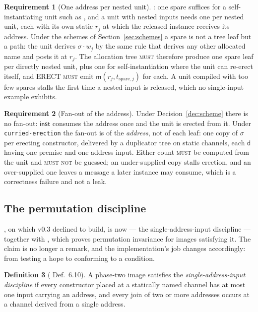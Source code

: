 \documentclass[11pt,a4paper]{article}
\newcommand{\code}[1]{\texttt{#1}}
\newcommand{\MUST}{\textsc{must}}
\newcommand{\MUSTNOT}{\textsc{must not}}
\newcommand{\mm}{\mathsf{m}}
\newcommand{\dd}{\mathsf{d}}
\newcommand{\ERECT}{\mathrm{ERECT}}
\newcommand{\inst}{\mathsf{inst}}
\theoremstyle{definition}
\newtheorem{definition}{Definition}[section]
\newtheorem{requirement}[definition]{Requirement}
\theoremstyle{plain}
\begin{document}
\begin{requirement}[One address per nested unit]\label{req:spares}
\cite[Rem.~6.13]{draft3}: one spare suffices for a self-instantiating unit
such as \cite[Ex.~6.9]{draft3}, and a unit with nested inputs needs one per
nested unit, each with its own static $r_{j}$ at which the released instance
receives its address. Under the schemes of Section~\ref{sec:schemes} a spare
is not a tree leaf but a path: the unit derives $\sigma\!\cdot\!w_{j}$ by the
same rule that derives any other allocated name and posts it at $r_{j}$. The allocation tree \MUST{} therefore produce one spare leaf per
directly nested unit, plus one for self-instantiation where the unit can
re-erect itself, and $\ERECT$ \MUST{} emit $\mm(r_{j}, t_{\mathrm{spare},j})$
for each. A unit compiled with too few spares stalls the first time a nested
input is released, which no single-input example exhibits.
\end{requirement}

\begin{requirement}[Fan-out of the address]\label{req:fanout}
Under Decision~\ref{dec:scheme} there is no fan-out: $\inst$ consumes the
address once and the unit is erected from it. Under
\code{curried-erection} the fan-out is of the \emph{address}, not of each
leaf: one copy of $\sigma$ per erecting constructor, delivered by a duplicator
tree on static channels, each $\dd$ having one premise and one address input. Either count \MUST{} be computed
from the unit and \MUSTNOT{} be guessed; an under-supplied copy stalls
erection, and an over-supplied one leaves a message a later instance may
consume, which is a correctness failure and not a leak.
\end{requirement}

\subsection{The permutation discipline}\label{sec:discipline}

\cite[Rem.~6.10]{draft3}, on which v0.3 declined to build, is now
\cite[Def.~6.10]{draft3} --- the single-address-input discipline --- together
with \cite[Lem.~6.11]{draft3}, which proves permutation invariance for images
satisfying it. The claim is no longer a remark, and the implementation's job
changes accordingly: from testing a hope to conforming to a condition.

\begin{definition}[\cite{draft3} Def.~6.10]\label{def:sai}
A phase-two image satisfies the \emph{single-address-input discipline} if
every constructor placed at a statically named channel has at most one input
carrying an address, and every join of two or more addresses occurs at a
channel derived from a single address.
\end{definition}
\end{document}

